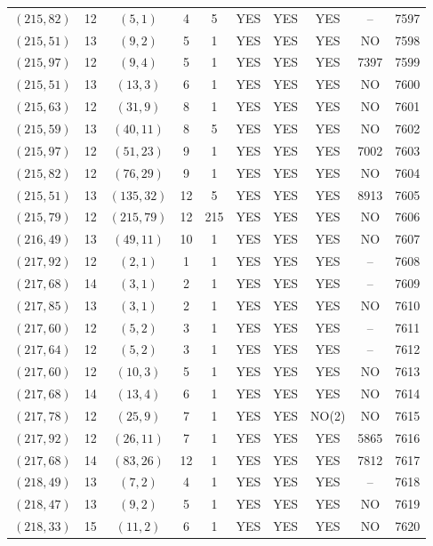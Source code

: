 \begin{longtable}{|c|c|c|c|c|c|c|c|c|c|}
$(215, 82)$ & 12 & $(5, 1)$ & 4 & 5 & YES & YES & YES & -- & 7597\\
$(215, 51)$ & 13 & $(9, 2)$ & 5 & 1 & YES & YES & YES & NO & 7598\\
$(215, 97)$ & 12 & $(9, 4)$ & 5 & 1 & YES & YES & YES & 7397 & 7599\\
$(215, 51)$ & 13 & $(13, 3)$ & 6 & 1 & YES & YES & YES & NO & 7600\\
$(215, 63)$ & 12 & $(31, 9)$ & 8 & 1 & YES & YES & YES & NO & 7601\\
$(215, 59)$ & 13 & $(40, 11)$ & 8 & 5 & YES & YES & YES & NO & 7602\\
$(215, 97)$ & 12 & $(51, 23)$ & 9 & 1 & YES & YES & YES & 7002 & 7603\\
$(215, 82)$ & 12 & $(76, 29)$ & 9 & 1 & YES & YES & YES & NO & 7604\\
$(215, 51)$ & 13 & $(135, 32)$ & 12 & 5 & YES & YES & YES & 8913 & 7605\\
$(215, 79)$ & 12 & $(215, 79)$ & 12 & 215 & YES & YES & YES & NO & 7606\\
$(216, 49)$ & 13 & $(49, 11)$ & 10 & 1 & YES & YES & YES & NO & 7607\\
$(217, 92)$ & 12 & $(2, 1)$ & 1 & 1 & YES & YES & YES & -- & 7608\\
$(217, 68)$ & 14 & $(3, 1)$ & 2 & 1 & YES & YES & YES & -- & 7609\\
$(217, 85)$ & 13 & $(3, 1)$ & 2 & 1 & YES & YES & YES & NO & 7610\\
$(217, 60)$ & 12 & $(5, 2)$ & 3 & 1 & YES & YES & YES & -- & 7611\\
$(217, 64)$ & 12 & $(5, 2)$ & 3 & 1 & YES & YES & YES & -- & 7612\\
$(217, 60)$ & 12 & $(10, 3)$ & 5 & 1 & YES & YES & YES & NO & 7613\\
$(217, 68)$ & 14 & $(13, 4)$ & 6 & 1 & YES & YES & YES & NO & 7614\\
$(217, 78)$ & 12 & $(25, 9)$ & 7 & 1 & YES & YES & NO(2) & NO & 7615\\
$(217, 92)$ & 12 & $(26, 11)$ & 7 & 1 & YES & YES & YES & 5865 & 7616\\
$(217, 68)$ & 14 & $(83, 26)$ & 12 & 1 & YES & YES & YES & 7812 & 7617\\
$(218, 49)$ & 13 & $(7, 2)$ & 4 & 1 & YES & YES & YES & -- & 7618\\
$(218, 47)$ & 13 & $(9, 2)$ & 5 & 1 & YES & YES & YES & NO & 7619\\
$(218, 33)$ & 15 & $(11, 2)$ & 6 & 1 & YES & YES & YES & NO & 7620\\

\end{longtable}
